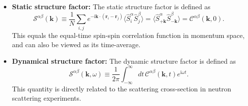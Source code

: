 \documentclass[aps, prx, nofootinbib, superscriptaddress]{revtex4-2}
\newcommand{\kvec}{\mathbf{k}}
\newcommand{\ri}{\mathrm{i}}
\newcommand{\Tr}{\mathrm{Tr}}
\begin{document}
\begin{itemize}
\begin{itemize}
        \begin{equation}
            \langle (S_{-\kvec}^{\beta} ( 0 ))^{\dagger} (S_{\kvec}^{\alpha} ( t ))^{\dagger} \rangle
            = 
            \begin{cases}
                \langle S_{\kvec}^{\bar{\beta}} (0) S_{-\kvec}^{\bar{\alpha}} (t) \rangle
                = \langle S_{\kvec}^{\bar{\beta}} (-t) S_{-\kvec}^{\bar{\alpha}} (0) \rangle
                = \mathcal{C}^{\bar{\beta}\bar{\alpha}}(-\kvec, -t), 
                & \text{if } \alpha,\beta = \pm, 0, \\[1em]
                \langle S_{\kvec}^{\beta} (0) S_{-\kvec}^{\alpha} (t) \rangle
                = \langle S_{\kvec}^{\beta} (-t) S_{-\kvec}^{\alpha} (0) \rangle 
                = \mathcal{C}^{\beta\alpha}(-\kvec, -t), 
                & \text{if } \alpha, \beta = x, y, z.
            \end{cases}
        \end{equation}
        where in the second equality we use the identity $\langle \hat{A}(0) \hat{B}(t) \rangle = \langle \hat{A}(-t) \hat{B}(0) \rangle$ for thermal states $\rho = e^{-\beta H}/Z$:
        \begin{equation}
            \langle \hat{A}(0) \hat{B}(t) \rangle
            = \Tr[\rho \hat{A} \hat{U}^{\dagger}_{t} \hat{B} \hat{U}_{t}] 
            = \Tr[\rho \hat{U}_{t} \hat{A} \hat{U}^{\dagger}_{t} \hat{B}(0)]  
            = \langle \hat{A}(-t) \hat{B}(0) \rangle.
        \end{equation}
    \end{itemize}
    
    \item \textbf{Static structure factor:}
    The static structure factor is defined as
    \begin{equation}
        \mathcal{S}^{\alpha\beta}(\kvec) 
        \equiv
        \frac{1}{N} \sum_{i,j} e^{-\ri \kvec \cdot (\mathbf{r}_{i} - \mathbf{r}_{j})}
        \big\langle \hat{S}^{\alpha}_{i} \hat{S}^{\beta}_{j} \big\rangle
        = \big\langle \hat{S}_{+ \kvec}^{\alpha} \hat{S}_{- \kvec}^{\beta} \big\rangle 
        = \mathcal{C}^{\alpha\beta}(\kvec, 0).
    \end{equation}
    This equals the equal-time spin-spin correlation function in momentum space, and can also be viewed as its time-average.

    
    \item \textbf{Dynamical structure factor:}
    The dynamic structure factor is defined as 
    \begin{equation}
        \mathcal{S}^{\alpha\beta}(\kvec, \omega) 
        \equiv \frac{1}{2\pi} \int_{-\infty}^{\infty} dt \, \mathcal{C}^{\alpha\beta}(\kvec, t) e^{\ri \omega t}.
    \end{equation}
    This quantity is directly related to the scattering cross-section in neutron scattering experiments.



\end{itemize}
\end{document}
